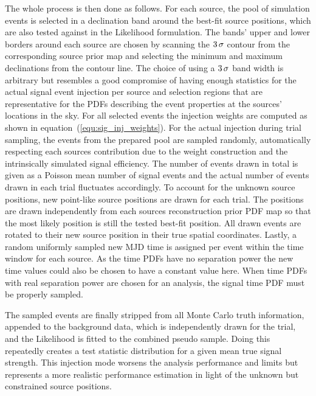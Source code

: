 The whole process is then done as follows.
For each source, the pool of simulation events is selected in a declination band around the best-fit source positions, which are also tested against in the Likelihood formulation.
The bands' upper and lower borders around each source are chosen by scanning the $\num{3}\,\sigma$ contour from the corresponding source prior map and selecting the minimum and maximum declinations from the contour line.
The choice of using a $\num{3}\,\sigma$ band width is arbitrary but resembles a good compromise of having enough statistics for the actual signal event injection per source and selection regions that are representative for the PDFs describing the event properties at the sources' locations in the sky.
For all selected events the injection weights are computed as shown in equation~(\ref{equ:sig_inj_weights}).
For the actual injection during trial sampling, the events from the prepared pool are sampled randomly, automatically respecting each sources contribution due to the weight construction and the intrinsically simulated signal efficiency.
The number of events drawn in total is given as a Poisson mean number of signal events and the actual number of events drawn in each trial fluctuates accordingly.
To account for the unknown source positions, new point-like source positions are drawn for each trial.
The positions are drawn independently from each sources reconstruction prior PDF map so that the most likely position is still the tested best-fit position.
All drawn events are rotated to their new source position in their true spatial coordinates.
Lastly, a random uniformly sampled new MJD time is assigned per event within the time window for each source.
As the time PDFs have no separation power the new time values could also be chosen to have a constant value here.
When time PDFs with real separation power are chosen for an analysis, the signal time PDF must be properly sampled.

The sampled events are finally stripped from all Monte Carlo truth information, appended to the background data, which is independently drawn for the trial, and the Likelihood is fitted to the combined pseudo sample.
Doing this repeatedly creates a test statistic distribution for a given mean true signal strength.
This injection mode worsens the analysis performance and limits but represents a more realistic performance estimation in light of the unknown but constrained source positions.

